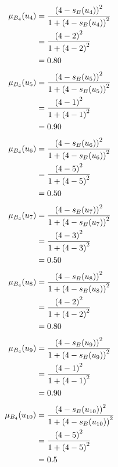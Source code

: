 \documentclass[a4paper,openany]{book}
\begin{document}
				\begin{align}
					\mu_{B_4}(u_4) &= \frac{\left(4-s_B(u_4)\right)^2}{1 + \left(4-s_B(u_4)\right)^2}\\
					&= \frac{\left(4-2\right)^2}{1 + \left(4-2\right)^2} \notag \\
					&= 0.80 \notag
				\end{align}
				\begin{align}
					\mu_{B_4}(u_5) &= \frac{\left(4-s_B(u_5)\right)^2}{1 + \left(4-s_B(u_5)\right)^2}\\
					&= \frac{\left(4-1\right)^2}{1 + \left(4-1\right)^2} \notag \\
					&= 0.90 \notag
				\end{align}
				\begin{align}
					\mu_{B_4}(u_6) &= \frac{\left(4-s_B(u_6)\right)^2}{1 + \left(4-s_B(u_6)\right)^2}\\
					&= \frac{\left(4-5\right)^2}{1 + \left(4-5\right)^2} \notag \\
					&= 0.50 \notag
				\end{align}
				\begin{align}
					\mu_{B_4}(u_7) &= \frac{\left(4-s_B(u_7)\right)^2}{1 + \left(4-s_B(u_7)\right)^2}\\
					&= \frac{\left(4-3\right)^2}{1 + \left(4-3\right)^2} \notag \\
					&= 0.50 \notag
				\end{align}
				\begin{align}
					\mu_{B_4}(u_8) &= \frac{\left(4-s_B(u_8)\right)^2}{1 + \left(4-s_B(u_8)\right)^2}\\
					&= \frac{\left(4-2\right)^2}{1 + \left(4-2\right)^2} \notag \\
					&= 0.80 \notag
				\end{align}
				\begin{align}
					\mu_{B_4}(u_9) &= \frac{\left(4-s_B(u_9)\right)^2}{1 + \left(4-s_B(u_9)\right)^2}\\
					&= \frac{\left(4-1\right)^2}{1 + \left(4-1\right)^2} \notag \\
					&= 0.90 \notag
				\end{align}
				\begin{align}
					\mu_{B_4}(u_{10}) &= \frac{\left(4-s_B(u_{10})\right)^2}{1 + \left(4-s_B(u_{10})\right)^2}\\
					&= \frac{\left(4-5\right)^2}{1 + \left(4-5\right)^2} \notag \\
					&= 0.5 \notag
				\end{align}
\end{document}
